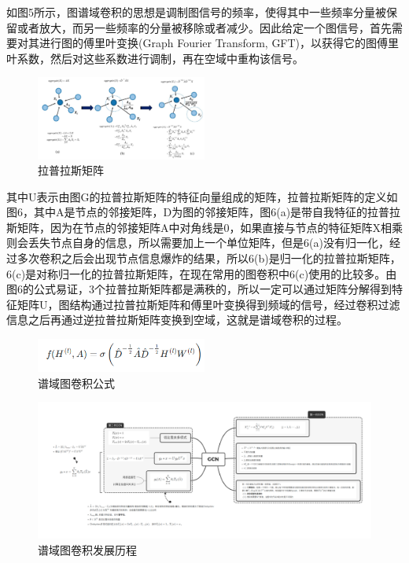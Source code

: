 \documentclass[10pt,journal,compsoc]{IEEEtran}
\begin{document}
如图5所示，图谱域卷积的思想是调制图信号的频率，使得其中一些频率分量被保留或者放大，而另一些频率的分量被移除或者减少。因此给定一个图信号，首先需要对其进行图的傅里叶变换(Graph Fourier Transform, GFT)，以获得它的图傅里叶系数，然后对这些系数进行调制，再在空域中重构该信号。

\begin{figure}
	\centering
	\includegraphics[width=0.5\textwidth]{2-4}
	\caption{拉普拉斯矩阵}
	\label{fig:拉普拉斯矩阵}
\end{figure}

其中U表示由图G的拉普拉斯矩阵的特征向量组成的矩阵，拉普拉斯矩阵的定义如图6，其中A是节点的邻接矩阵，D为图的邻接矩阵，图6(a)是带自我特征的拉普拉斯矩阵，因为在节点的邻接矩阵A中对角线是0，如果直接与节点的特征矩阵X相乘则会丢失节点自身的信息，所以需要加上一个单位矩阵，但是6(a)没有归一化，经过多次卷积之后会出现节点信息爆炸的结果，所以6(b)是归一化的拉普拉斯矩阵，6(c)是对称归一化的拉普拉斯矩阵，在现在常用的图卷积中6(c)使用的比较多。由图6的公式易证，3个拉普拉斯矩阵都是满秩的，所以一定可以通过矩阵分解得到特征矩阵U，图结构通过拉普拉斯矩阵和傅里叶变换得到频域的信号，经过卷积过滤信息之后再通过逆拉普拉斯矩阵变换到空域，这就是谱域卷积的过程。
\begin{figure}
	\centering
	\includegraphics[width=0.5\textwidth]{2-6}
	\caption{谱域图卷积公式}
	\label{fig:谱域图卷积公式}
\end{figure}

\begin{figure}
	\centering
	\includegraphics[width=1\textwidth]{2-5}
	\caption{谱域图卷积发展历程}
	\label{fig:谱域图卷积发展历程}
\end{figure}
\end{document}
